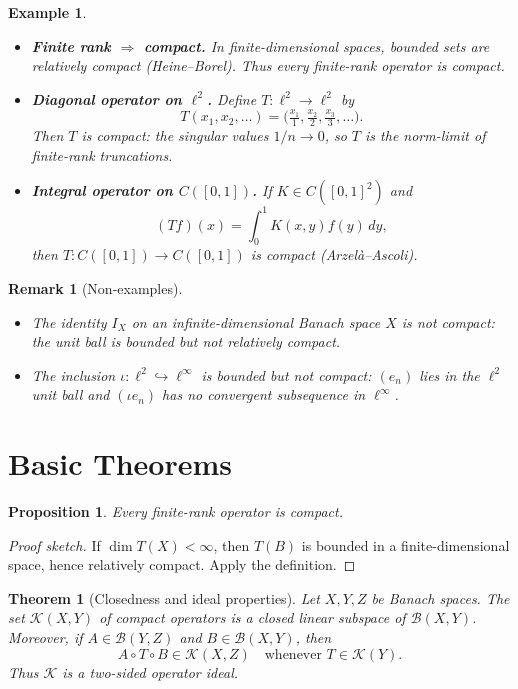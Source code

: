 \documentclass[11pt]{article}
\newtheorem{theorem}{Theorem}
\newtheorem{proposition}{Proposition}
\newtheorem{remark}{Remark}
\newtheorem{example}{Example}
\begin{document}
\begin{example}
\leavevmode
\begin{itemize}
  \item \textbf{Finite rank $\Rightarrow$ compact.} In finite-dimensional spaces, bounded sets are relatively compact (Heine--Borel). Thus every finite-rank operator is compact.
  \item \textbf{Diagonal operator on $\ell^2$.} Define $T:\ell^2\to\ell^2$ by
  \[
    T(x_1,x_2,\dots)=\bigl(\tfrac{x_1}{1},\tfrac{x_2}{2},\tfrac{x_3}{3},\dots\bigr).
  \]
  Then $T$ is compact: the singular values $1/n\to 0$, so $T$ is the norm-limit of finite-rank truncations.
  \item \textbf{Integral operator on $C([0,1])$.} If $K\in C([0,1]^2)$ and
  \[
    (Tf)(x)=\int_0^1 K(x,y)f(y)\,dy,
  \]
  then $T:C([0,1])\to C([0,1])$ is compact (Arzel\`a--Ascoli).
\end{itemize}
\end{example}

\begin{remark}[Non-examples]
\leavevmode
\begin{itemize}
  \item The identity $I_X$ on an infinite-dimensional Banach space $X$ is \emph{not} compact: the unit ball is bounded but not relatively compact.
  \item The inclusion $\iota:\ell^2\hookrightarrow \ell^\infty$ is bounded but \emph{not} compact: $(e_n)$ lies in the $\ell^2$ unit ball and $(\iota e_n)$ has no convergent subsequence in $\ell^\infty$.
\end{itemize}
\end{remark}

\section{Basic Theorems}
\begin{proposition}\label{prop:fr-compact}
Every finite-rank operator is compact.
\end{proposition}
\begin{proof}[Proof sketch]
If $\dim T(X)<\infty$, then $T(B)$ is bounded in a finite-dimensional space, hence relatively compact. Apply the definition.
\end{proof}

\begin{theorem}[Closedness and ideal properties]
Let $X,Y,Z$ be Banach spaces. The set $\mathcal{K}(X,Y)$ of compact operators is a closed linear subspace of $\mathcal{B}(X,Y)$. Moreover, if $A\in\mathcal{B}(Y,Z)$ and $B\in\mathcal{B}(X,Y)$, then 
\[
A\circ T\circ B\in \mathcal{K}(X,Z)\quad\text{whenever }T\in\mathcal{K}(Y).
\]
Thus $\mathcal{K}$ is a two-sided operator ideal.
\end{theorem}
\end{document}
